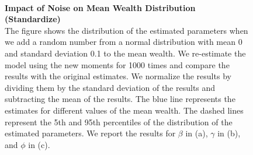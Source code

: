 \begin{figure}[!htb]
    \centering
    \caption{\textbf{Impact of Noise on Mean Wealth Distribution (Standardize)} \\ 
    \small{
    The figure shows the distribution of the estimated parameters when we add a random number from a normal distribution with mean 0 and standard deviation 0.1 to the mean wealth. We re-estimate the model using the new moments for 1000 times and compare the results with the original estimates.  We normalize the results by dividing them by the standard deviation of the results and subtracting the mean of the results.
    The blue line represents the estimates for different values of the mean wealth. The dashed lines represent the 5th and 95th percentiles of the distribution of the estimated parameters.
    We report the results for $\beta$ in (a), $\gamma$ in (b), and $\phi$ in (c).
    }
    }
    \label{fig:robustness_standard_check}

    \\
\end{figure}